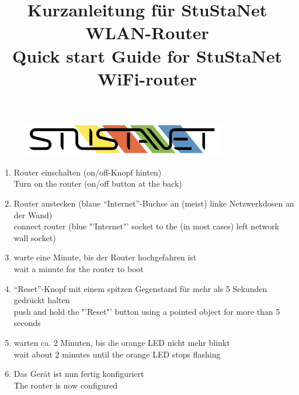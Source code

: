 \documentclass[a4paper,11pt]{scrartcl}
\title{Kurzanleitung für StuStaNet WLAN-Router\\Quick start Guide for StuStaNet WiFi-router}
\date{}
\begin{document}
	
	\maketitle
	
	\begin{figure}[t!]
		\centering
		\vspace{-20pt}
		\includegraphics[width=0.8\textwidth,keepaspectratio]{Bilder/StuStaNet_Logo}
		\vspace{-50pt}
	\end{figure}
	
	\vspace{-70pt}
	
	
	\begin{enumerate}
		\item Router einschalten (on/off-Knopf hinten)\\
		Turn on the router (on/off button at the back)
		\item Router anstecken (blaue "`Internet"'-Buchse an (meist) linke Netzwerkdosen an der Wand)\\
		connect router (blue "'Internet"' socket to the (in most cases) left network wall socket)
		\item warte eine Minute, bis der Router hochgefahren ist\\
		wait a minute for the router to boot
		\item "`Reset"'-Knopf mit einem spitzen Gegenstand für mehr als 5 Sekunden gedrückt halten\\
		push and hold the "'Reset"' button using a pointed object for more than 5 seconds
		\item warten ca. 2 Minuten, bis die orange LED nicht mehr blinkt\\
		wait about 2 minutes until the orange LED stops flashing
		\item Das Gerät ist nun fertig konfiguriert\\
		The router is now configured\\[1em]
	\end{enumerate}
	
\end{document}
